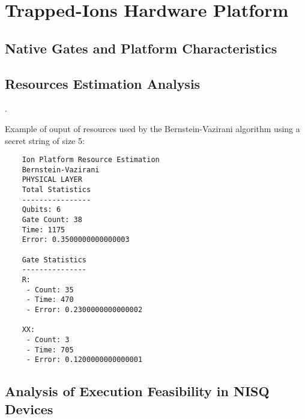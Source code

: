 %
%
\chapter {Trapped-Ions Hardware Platform}


\section{Native Gates and Platform Characteristics}


\section{Resources Estimation Analysis}

.

Example of ouput of resources used by the Bernstein-Vazirani algorithm using a secret string of size 5:
\begin{lstlisting}
    Ion Platform Resource Estimation
    Bernstein-Vazirani
    PHYSICAL LAYER
    Total Statistics
    ----------------
    Qubits: 6
    Gate Count: 38
    Time: 1175
    Error: 0.3500000000000003
    
    Gate Statistics
    ---------------
    R:
     - Count: 35
     - Time: 470
     - Error: 0.2300000000000002
    
    XX:
     - Count: 3
     - Time: 705
     - Error: 0.1200000000000001
\end{lstlisting}

\section{Analysis of Execution Feasibility in NISQ Devices}

